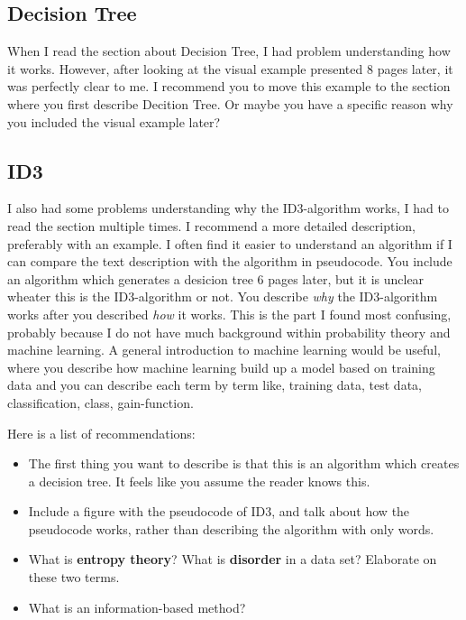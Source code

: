 \documentclass[
10pt, %
a4paper, %
oneside, %
headinclude,footinclude, %
BCOR5mm, %
]{scrartcl}
\begin{document}
{\subsection*{Decision Tree}
When I read the section about Decision Tree, I had problem understanding how it works. However, after looking at the visual example presented 8 pages later, it was perfectly clear to me. I recommend you to move this example to the section where you first describe Decition Tree. Or maybe you have a specific reason why you included the visual example later?

\subsection*{ID3}
I also had some problems  understanding why the ID3-algorithm works, I had to read the section multiple times. I recommend a more detailed description, preferably with an example. I often find it easier to understand an algorithm if I can compare the text description with the algorithm in pseudocode. You include an algorithm which generates a desicion tree 6 pages later, but it is unclear wheater this is the ID3-algorithm or not. 
\newline
\newline
You describe \emph{why} the ID3-algorithm works after you described \emph{how} it works. This is the part I found most confusing, probably because I do not have much background within probability theory and machine learning. A general introduction to machine learning would be useful, where you describe how machine learning build up a model based on training data and you can describe each term by term like, training data, test data, classification, class, gain-function. 

Here is a list of recommendations:
\begin{itemize}
    \item The first thing you want to describe is that this is an algorithm which creates a decision tree. It feels like you assume the reader knows this.
    \item Include a figure with the pseudocode of ID3, and talk about how the pseudocode works, rather than describing the algorithm with only words.
    \item What is \textbf{entropy theory}? What is \textbf{disorder} in a data set? Elaborate on these two terms.
    \item What is an information-based method?
\end{itemize}

}
\end{document}
